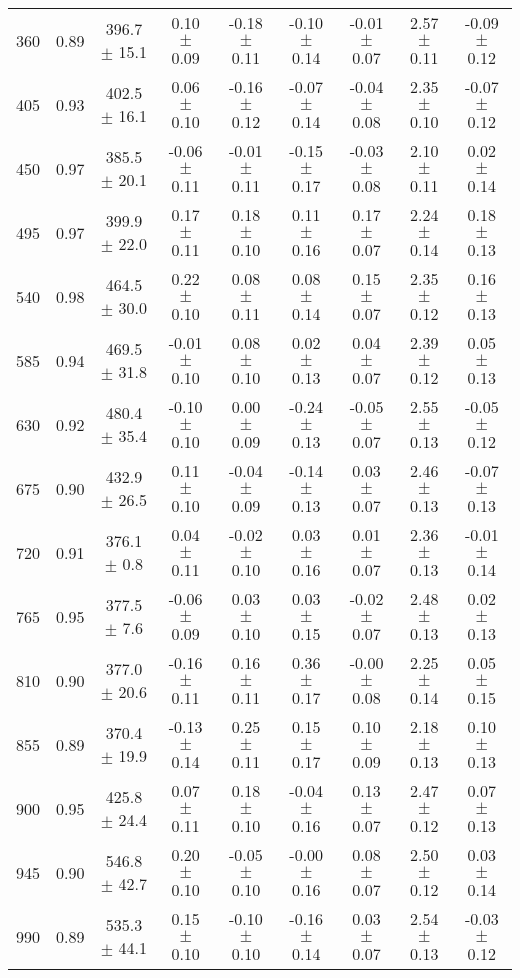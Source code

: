 \documentclass[twocolumn]{aastex61}%
\begin{document}
\begin{table*}[ht]
\begin{tabular}{ccc|ccccc|c}
360 & 0.89 & 396.7 $\pm$ 15.1 & 0.10 $\pm$ 0.09 & -0.18 $\pm$ 0.11 & -0.10 $\pm$ 0.14 & -0.01 $\pm$ 0.07 & 2.57 $\pm$ 0.11 & -0.09 $\pm$ 0.12\\
405 & 0.93 & 402.5 $\pm$ 16.1 & 0.06 $\pm$ 0.10 & -0.16 $\pm$ 0.12 & -0.07 $\pm$ 0.14 & -0.04 $\pm$ 0.08 & 2.35 $\pm$ 0.10 & -0.07 $\pm$ 0.12\\
450 & 0.97 & 385.5 $\pm$ 20.1 & -0.06 $\pm$ 0.11 & -0.01 $\pm$ 0.11 & -0.15 $\pm$ 0.17 & -0.03 $\pm$ 0.08 & 2.10 $\pm$ 0.11 & 0.02 $\pm$ 0.14\\
495 & 0.97 & 399.9 $\pm$ 22.0 & 0.17 $\pm$ 0.11 & 0.18 $\pm$ 0.10 & 0.11 $\pm$ 0.16 & 0.17 $\pm$ 0.07 & 2.24 $\pm$ 0.14 & 0.18 $\pm$ 0.13\\
540 & 0.98 & 464.5 $\pm$ 30.0 & 0.22 $\pm$ 0.10 & 0.08 $\pm$ 0.11 & 0.08 $\pm$ 0.14 & 0.15 $\pm$ 0.07 & 2.35 $\pm$ 0.12 & 0.16 $\pm$ 0.13\\
585 & 0.94 & 469.5 $\pm$ 31.8 & -0.01 $\pm$ 0.10 & 0.08 $\pm$ 0.10 & 0.02 $\pm$ 0.13 & 0.04 $\pm$ 0.07 & 2.39 $\pm$ 0.12 & 0.05 $\pm$ 0.13\\
630 & 0.92 & 480.4 $\pm$ 35.4 & -0.10 $\pm$ 0.10 & 0.00 $\pm$ 0.09 & -0.24 $\pm$ 0.13 & -0.05 $\pm$ 0.07 & 2.55 $\pm$ 0.13 & -0.05 $\pm$ 0.12\\
675 & 0.90 & 432.9 $\pm$ 26.5 & 0.11 $\pm$ 0.10 & -0.04 $\pm$ 0.09 & -0.14 $\pm$ 0.13 & 0.03 $\pm$ 0.07 & 2.46 $\pm$ 0.13 & -0.07 $\pm$ 0.13\\
720 & 0.91 & 376.1 $\pm$ 0.8 & 0.04 $\pm$ 0.11 & -0.02 $\pm$ 0.10 & 0.03 $\pm$ 0.16 & 0.01 $\pm$ 0.07 & 2.36 $\pm$ 0.13 & -0.01 $\pm$ 0.14\\
765 & 0.95 & 377.5 $\pm$ 7.6 & -0.06 $\pm$ 0.09 & 0.03 $\pm$ 0.10 & 0.03 $\pm$ 0.15 & -0.02 $\pm$ 0.07 & 2.48 $\pm$ 0.13 & 0.02 $\pm$ 0.13\\
810 & 0.90 & 377.0 $\pm$ 20.6 & -0.16 $\pm$ 0.11 & 0.16 $\pm$ 0.11 & 0.36 $\pm$ 0.17 & -0.00 $\pm$ 0.08 & 2.25 $\pm$ 0.14 & 0.05 $\pm$ 0.15\\
855 & 0.89 & 370.4 $\pm$ 19.9 & -0.13 $\pm$ 0.14 & 0.25 $\pm$ 0.11 & 0.15 $\pm$ 0.17 & 0.10 $\pm$ 0.09 & 2.18 $\pm$ 0.13 & 0.10 $\pm$ 0.13\\
900 & 0.95 & 425.8 $\pm$ 24.4 & 0.07 $\pm$ 0.11 & 0.18 $\pm$ 0.10 & -0.04 $\pm$ 0.16 & 0.13 $\pm$ 0.07 & 2.47 $\pm$ 0.12 & 0.07 $\pm$ 0.13\\
945 & 0.90 & 546.8 $\pm$ 42.7 & 0.20 $\pm$ 0.10 & -0.05 $\pm$ 0.10 & -0.00 $\pm$ 0.16 & 0.08 $\pm$ 0.07 & 2.50 $\pm$ 0.12 & 0.03 $\pm$ 0.14\\
990 & 0.89 & 535.3 $\pm$ 44.1 & 0.15 $\pm$ 0.10 & -0.10 $\pm$ 0.10 & -0.16 $\pm$ 0.14 & 0.03 $\pm$ 0.07 & 2.54 $\pm$ 0.13 & -0.03 $\pm$ 0.12\\

\end{tabular}
\end{table*}
\end{document}
